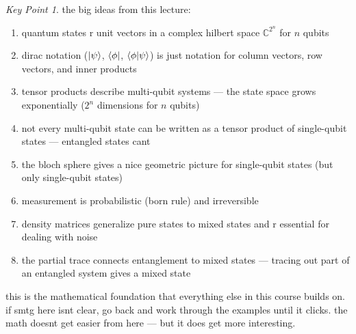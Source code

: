 \documentclass[11pt,a4paper]{article}
\theoremstyle{definition}
\theoremstyle{remark}
\newtheorem*{keypoint}{Key Point}
\begin{document}
\begin{keypoint}
the big ideas from this lecture:
\begin{enumerate}
    \item quantum states r unit vectors in a complex hilbert space $\mathbb{C}^{2^n}$ for $n$ qubits
    \item dirac notation ($\ket{\psi}$, $\bra{\phi}$, $\braket{\phi|\psi}$) is just notation for column vectors, row vectors, and inner products
    \item tensor products describe multi-qubit systems --- the state space grows exponentially ($2^n$ dimensions for $n$ qubits)
    \item not every multi-qubit state can be written as a tensor product of single-qubit states --- entangled states cant
    \item the bloch sphere gives a nice geometric picture for single-qubit states (but only single-qubit states)
    \item measurement is probabilistic (born rule) and irreversible
    \item density matrices generalize pure states to mixed states and r essential for dealing with noise
    \item the partial trace connects entanglement to mixed states --- tracing out part of an entangled system gives a mixed state
\end{enumerate}
\end{keypoint}

this is the mathematical foundation that everything else in this course builds on. if smtg here isnt clear, go back and work through the examples until it clicks. the math doesnt get easier from here --- but it does get more interesting.
\end{document}
